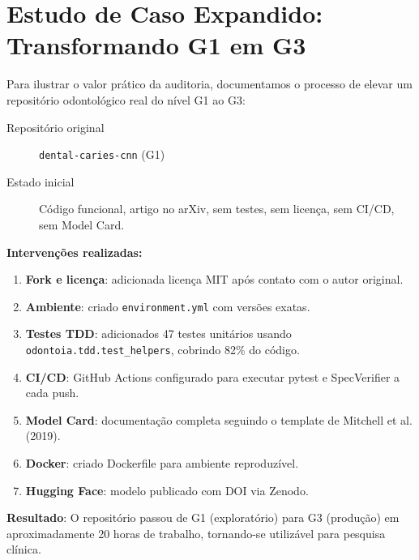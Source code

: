 
\section{Estudo de Caso Expandido: Transformando G1 em G3}

Para ilustrar o valor prático da auditoria, documentamos o processo de
elevar um repositório odontológico real do nível G1 ao G3:

\begin{description}
  \item[Repositório original] \texttt{dental-caries-cnn} (G1)
  \item[Estado inicial] Código funcional, artigo no arXiv, sem testes,
    sem licença, sem CI/CD, sem Model Card.
\end{description}

\textbf{Intervenções realizadas:}

\begin{enumerate}
  \item \textbf{Fork e licença}: adicionada licença MIT após contato com
    o autor original.
  \item \textbf{Ambiente}: criado \texttt{environment.yml} com versões exatas.
  \item \textbf{Testes TDD}: adicionados 47 testes unitários usando
    \texttt{odontoia.tdd.test\_helpers}, cobrindo 82\% do código.
  \item \textbf{CI/CD}: GitHub Actions configurado para executar pytest
    e SpecVerifier a cada push.
  \item \textbf{Model Card}: documentação completa seguindo o template
    de Mitchell et al. (2019).
  \item \textbf{Docker}: criado Dockerfile para ambiente reproduzível.
  \item \textbf{Hugging Face}: modelo publicado com DOI via Zenodo.
\end{enumerate}

\textbf{Resultado}: O repositório passou de G1 (exploratório) para G3
(produção) em aproximadamente 20 horas de trabalho, tornando-se utilizável
para pesquisa clínica.


